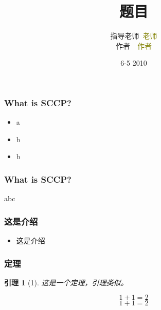 \documentclass[CJK,notheorems,mathserif,table]{beamer}
\title{\heiti 题目}
\author[\textcolor{white}{\songti 作者~XX君}]{{\songti 指导老师~\textcolor{olive}{老师}}\\{\songti 作者~~\textcolor{olive}{作者}}}
\institute{\wuhao \lishu \textcolor{violet}{a大学~~XX系 }}
\date{6-5 2010}
\newtheorem{lemma}{引理}
\begin{document}
 \begin{CJK*}{GBK}{kai}

\begin{frame}
	\titlepage
\end{frame}
\begin{frame}
\frametitle{What is SCCP?}
\begin{itemize}
 \item a
 \item b
 \item b
\end{itemize}
\end{frame}
\begin{frame}
\frametitle{What is SCCP?}
abc
\end{frame}
\begin{frame}
\frametitle{这是介绍}
\begin{itemize}
 \item 这是介绍
\end{itemize}
\end{frame}
\begin{frame}\frametitle{定理}
\begin{lemma}[1]
这是一个定理，引理类似。
\end{lemma}
\pause                       %
\begin{displaymath}             %
1+1=2
\end{displaymath}
\begin{equation}
1+1=2
\end{equation}
\end{frame}

\end{CJK*}
\end{document}
